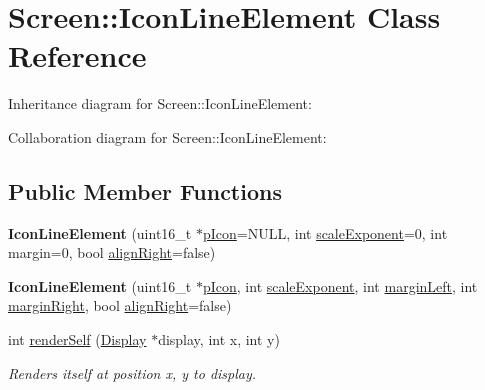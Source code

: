 \hypertarget{classScreen_1_1IconLineElement}{}\section{Screen\+:\+:Icon\+Line\+Element Class Reference}
\label{classScreen_1_1IconLineElement}


Inheritance diagram for Screen\+:\+:Icon\+Line\+Element\+:


Collaboration diagram for Screen\+:\+:Icon\+Line\+Element\+:
\subsection*{Public Member Functions}
\begin{DoxyCompactItemize}
\item 
\mbox{\label{classScreen_1_1IconLineElement_ad465a9f557b9f7e659ebfb8a5a995ca6}} 
{\bfseries Icon\+Line\+Element} (uint16\+\_\+t $\ast$\mbox{\hyperlink{classScreen_1_1IconLineElement_ae84108a5bfda7ba013401c067a8c9aca}{p\+Icon}}=N\+U\+LL, int \mbox{\hyperlink{classScreen_1_1IconLineElement_a95ab319fab5abe27266a092fdb75b58e}{scale\+Exponent}}=0, int margin=0, bool \mbox{\hyperlink{classScreen_1_1LineElement_a0c5f4e33c2df1dce8e4e45b90dac1423}{align\+Right}}=false)
\item 
\mbox{\label{classScreen_1_1IconLineElement_a7bba2dffbe294ad65c4cda9d7e462bc6}} 
{\bfseries Icon\+Line\+Element} (uint16\+\_\+t $\ast$\mbox{\hyperlink{classScreen_1_1IconLineElement_ae84108a5bfda7ba013401c067a8c9aca}{p\+Icon}}, int \mbox{\hyperlink{classScreen_1_1IconLineElement_a95ab319fab5abe27266a092fdb75b58e}{scale\+Exponent}}, int \mbox{\hyperlink{classScreen_1_1LineElement_a9ed23f9510a11334af9be6f53965f7a6}{margin\+Left}}, int \mbox{\hyperlink{classScreen_1_1LineElement_a3a2077f01072be8e8fd0f4539b85beb0}{margin\+Right}}, bool \mbox{\hyperlink{classScreen_1_1LineElement_a0c5f4e33c2df1dce8e4e45b90dac1423}{align\+Right}}=false)
\item 
int \mbox{\hyperlink{classScreen_1_1IconLineElement_a3ee090b31ee5061974552be4688d937b}{render\+Self}} (\mbox{\hyperlink{classDisplay}{Display}} $\ast$display, int x, int y)
\begin{DoxyCompactList}\small\item\em Renders itself at position x, y to display. \end{DoxyCompactList}\end{DoxyCompactItemize}
